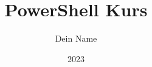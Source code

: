 \documentclass{article}
\title{PowerShell Kurs}
\author{Dein Name}
\date{2023}
\begin{document}
	
	\maketitlepage
	
	\tableofcontents
	\newpage
	
	
	
	
\end{document}
